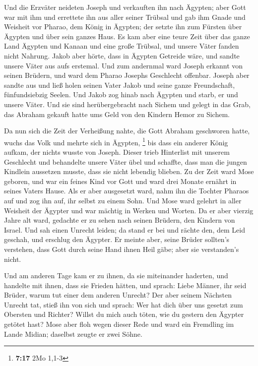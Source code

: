  Und die Erzväter neideten Joseph und verkauften ihn nach
Ägypten; aber Gott war mit ihm  und errettete ihn aus aller
seiner Trübsal und gab ihm Gnade und Weisheit vor Pharao, dem König in
Ägypten; der setzte ihn zum Fürsten über Ägypten und über sein ganzes
Haus.  Es kam aber eine teure Zeit über das ganze Land
Ägypten und Kanaan und eine große Trübsal, und unsere Väter fanden nicht
Nahrung.  Jakob aber hörte, dass in Ägypten Getreide wäre,
und sandte unsere Väter aus aufs erstemal.  Und zum
andernmal ward Joseph erkannt von seinen Brüdern, und ward dem Pharao
Josephs Geschlecht offenbar.  Joseph aber sandte aus und
ließ holen seinen Vater Jakob und seine ganze Freundschaft,
fünfundsiebzig Seelen.  Und Jakob zog hinab nach Ägypten
und starb, er und unsere Väter.  Und sie sind
herübergebracht nach Sichem und gelegt in das Grab, das Abraham gekauft
hatte ums Geld von den Kindern Hemor zu Sichem.

 Da nun sich die Zeit der Verheißung nahte, die Gott
Abraham geschworen hatte, wuchs das Volk und mehrte sich in Ägypten,
\footnote{\textbf{7:17} 2Mo 1,1-3}  bis dass ein anderer
König aufkam, der nichts wusste von Joseph.  Dieser trieb
Hinterlist mit unserem Geschlecht und behandelte unsere Väter übel und
schaffte, dass man die jungen Kindlein aussetzen musste, dass sie nicht
lebendig blieben.  Zu der Zeit ward Mose geboren, und war
ein feines Kind vor Gott und ward drei Monate ernährt in seines Vaters
Hause.  Als er aber ausgesetzt ward, nahm ihn die Tochter
Pharaos auf und zog ihn auf, ihr selbst zu einem Sohn.  Und
Mose ward gelehrt in aller Weisheit der Ägypter und war mächtig in
Werken und Worten.  Da er aber vierzig Jahre alt ward,
gedachte er zu sehen nach seinen Brüdern, den Kindern von Israel.
 Und sah einen Unrecht leiden; da stand er bei und rächte
den, dem Leid geschah, und erschlug den Ägypter.  Er meinte
aber, seine Brüder sollten's verstehen, dass Gott durch seine Hand ihnen
Heil gäbe; aber sie verstanden's nicht.

 Und am anderen Tage kam er zu ihnen, da sie miteinander
haderten, und handelte mit ihnen, dass sie Frieden hätten, und sprach:
Liebe Männer, ihr seid Brüder, warum tut einer dem anderen Unrecht?
 Der aber seinem Nächsten Unrecht tat, stieß ihn von sich
und sprach: Wer hat dich über uns gesetzt zum Obersten und Richter?
 Willst du mich auch töten, wie du gestern den Ägypter
getötet hast?  Mose aber floh wegen dieser Rede und ward
ein Fremdling im Lande Midian; daselbst zeugte er zwei Söhne.

